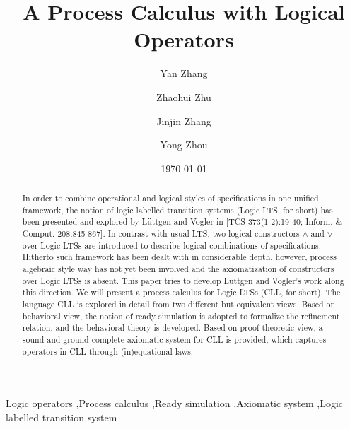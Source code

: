 \documentclass{elsarticle}
\theoremstyle{plain}
\theoremstyle{definition}
\begin{document}
\author[nuaa]{Yan Zhang}

\author[nuaa]{Zhaohui Zhu}

\author[nanshen]{Jinjin Zhang}

\author[nuaa]{Yong Zhou}


\address[nuaa]{College of Computer Science, Nanjing University of Aeronautics and Astronautics, Nanjing, P.R. China, 210016}
\address[nanshen]{College of Information Science, Nanjing Audit University, \\Nanjing, P.R. China, 211815}


\title{A Process Calculus with Logical Operators}
\date{\today}
\begin{abstract}

In order to combine operational and logical styles of specifications in one unified framework, the notion of logic labelled transition systems (Logic LTS, for short) has been presented and explored by L\"{u}ttgen and Vogler in [TCS 373(1-2):19-40; Inform. \& Comput. 208:845-867].
In contrast with usual LTS, two logical constructors $\wedge$ and $\vee$ over Logic LTSs are introduced to describe logical combinations of specifications.
Hitherto such framework has been dealt with in considerable depth, however, process algebraic style way has not yet been involved and the axiomatization of constructors over Logic LTSs is absent.
This paper tries to develop L\"{u}ttgen and Vogler's work along this direction.
We will present a process calculus for Logic LTSs (CLL, for short).
The language CLL is explored in detail from two different but equivalent views.
Based on behavioral view, the notion of ready simulation is adopted to formalize the refinement relation, and the behavioral theory is developed.
Based on proof-theoretic view, a sound and ground-complete axiomatic system for CLL is provided, which captures operators in CLL through (in)equational laws.
\end{abstract}

\begin{keyword}
  Logic operators \sep Process calculus \sep Ready simulation \sep Axiomatic system \sep Logic labelled transition system
\end{keyword}
\end{document}
